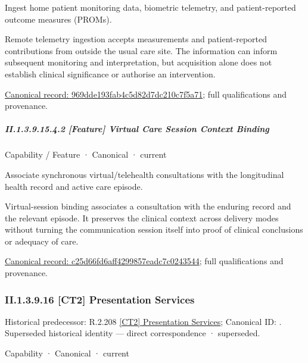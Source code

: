Ingest home patient monitoring data, biometric telemetry, and patient-reported outcome measures (PROMs).



Remote telemetry ingestion accepts measurements and patient-reported contributions from outside the usual care site. The information can inform subsequent monitoring and interpretation, but acquisition alone does not establish clinical significance or authorise an intervention.


{\footnotesize \href{../../../../../../../continuum/strategy/capability/feature/969dde193fab4c5d82d7dc210c7f5a71.md}{Canonical record: 969dde193fab4c5d82d7dc210c7f5a71}; full qualifications and provenance.}\par
\subparagraph*{II.1.3.9.15.4.2 [Feature] Virtual Care Session Context Binding}
\label{navigation:II.1.3.9.15.4.2}

\label{element:c25d66fd6aff4299857eadc7c0243544}
{\small Capability / Feature · Canonical · current}\par

Associate synchronous virtual/telehealth consultations with the longitudinal health record and active care episode.



Virtual-session binding associates a consultation with the enduring record and the relevant episode. It preserves the clinical context across delivery modes without turning the communication session itself into proof of clinical conclusions or adequacy of care.


{\footnotesize \href{../../../../../../../continuum/strategy/capability/feature/c25d66fd6aff4299857eadc7c0243544.md}{Canonical record: c25d66fd6aff4299857eadc7c0243544}; full qualifications and provenance.}\par
\subsubsection*{II.1.3.9.16 [CT2] Presentation Services}
\label{navigation:II.1.3.9.16}

{\small Historical predecessor: R.2.208 \hyperref[element:c89e7c8b277247d9965fdb534aad2d1f]{[CT2] Presentation Services}; Canonical ID: \texttt{}. Superseded historical identity — direct correspondence · superseded.}\par
\label{element:e9b6ba1917ba44cca7466444d0836c98}
{\small Capability · Canonical · current}\par

